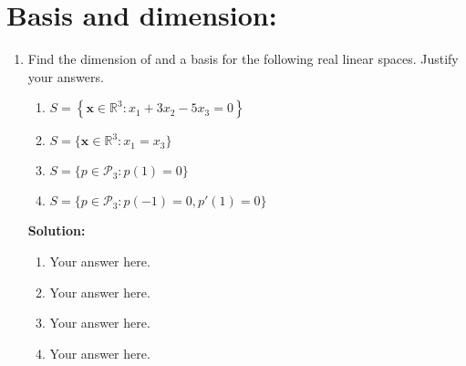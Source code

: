 \documentclass[]{article}
\newcommand{\R}{\mathbb{R}}				%
\newcommand{\x}{\bm{x}}					%
\newcommand{\solution}{\vskip 0.5cm \textbf{\large Solution:} \\}
\begin{document}
\section*{Basis and dimension:}
\begin{enumerate}[resume]

	\item Find the dimension of and a basis for the following real linear spaces. Justify your answers.
	\begin{enumerate}
		\item $S=\left\{\x\in\R^3 : x_1+3x_2-5x_3=0 \right\}$
		\item $S=\{\x\in\R^3 : x_1=x_3 \}$
		\item $S = \{p\in\mathcal{P}_3: p(1)=0\}$
		\item $S = \{p\in\mathcal{P}_3: p(-1)=0, p'(1)=0\}$
	\end{enumerate}

	\solution
	\begin{enumerate}
		\item Your answer here.
		\item Your answer here.
		\item Your answer here.
		\item Your answer here.
	\end{enumerate}
\end{enumerate}
\end{document}

